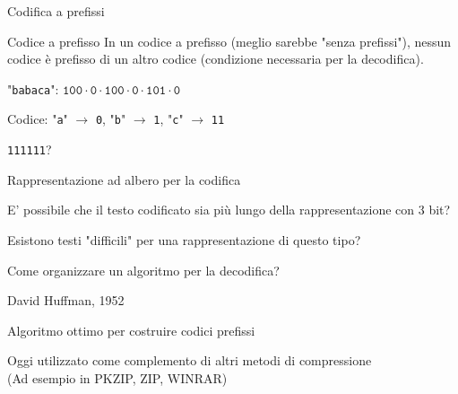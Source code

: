 \begin{frame}{Codifica a prefissi}

\begin{block}{Codice a prefisso}
In un codice a prefisso (meglio sarebbe "senza prefissi"), \alert{nessun codice è
prefisso di un altro codice} (condizione necessaria per la decodifica).
\end{block}

\bigskip
{}
\BI
\item "\texttt{babaca}": $\texttt{100} \cdot \texttt{0} \cdot \texttt{100} \cdot \texttt{0} \cdot \texttt{101} \cdot \texttt{0}$
\EI

\bigskip
{}
\BI
\item Codice: "\texttt{a}" $\rightarrow$ \texttt{0}, "\texttt{b}" $\rightarrow$ \texttt{1}, "\texttt{c}" $\rightarrow$ \texttt{11}
\item \texttt{111111}?
\EI

\end{frame}


\begin{frame}{Rappresentazione ad albero per la codifica}

\BIL
\item E' possibile che il testo codificato sia più lungo della rappresentazione con 3 bit?
\item Esistono testi "difficili" per una rappresentazione di questo tipo?
\item Come organizzare un algoritmo per la decodifica?
\EIL

\medskip
{}
\BIL
\item David Huffman, 1952
\item Algoritmo ottimo per costruire codici prefissi
\item Oggi utilizzato come complemento di altri metodi di compressione\\
(Ad esempio in PKZIP, ZIP, WINRAR)

\EIL

\end{frame}


